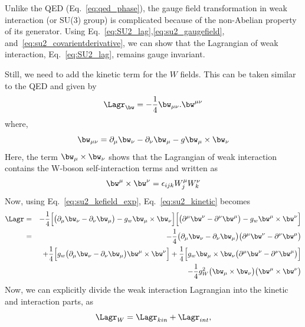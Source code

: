 Unlike the QED (Eq.~\ref{eq:qed_phase}), the gauge field transformation in weak interaction (or SU(3) group) is complicated because of the non-Abelian property of its generator. Using Eq.~\ref{eq:SU2_lag},\ref{eq:su2_gaugefield}, and~\ref{eq:su2_covarientderivative}, we can show that the Lagrangian of weak interaction, Eq.~\ref{eq:SU2_lag}, remains gauge invariant.

Still, we need to add the kinetic term for the $W$ fields. This can be taken similar to the QED and given by
\begin{equation}\label{eq:su2_kinetic}
    \Lagr_{\bw} = -\frac{1}{4}\bw_{\mu \nu}. \bw^{\mu \nu}
\end{equation}
where,
\begin{equation}\label{eq:su2_kefield_exp}
    \bw_{\mu \nu} = \partial_{\mu} \bw_{\nu} - \partial_{\nu} \bw_{\mu} - g \bw_{\mu} \times \bw_{\nu}
\end{equation}
Here, the term $\bw_{\mu} \times \bw_{\nu}$ shows that the Lagrangian of weak interaction contains the W-boson self-interaction terms and written as
\begin{equation}
    \bw^{\mu} \times \bw^{\nu} = \epsilon_{ijk} W^{\mu}_j W^{\nu}_k
\end{equation}
Now, using Eq.~\ref{eq:su2_kefield_exp}, Eq.~\ref{eq:su2_kinetic} becomes
\begin{eqnarray}
    \Lagr & = & -\frac{1}{4} \Big[ \big( \partial_{\mu} \bw_{\nu} - \partial_{\nu} \bw_{\mu} \big) - g_w \bw_{\mu} \times \bw_{\nu} \Big]  \Big[ \big( \partial^{\mu} \bw^{\nu} - \partial^{\nu} \bw^{\mu} \big) - g_w \bw^{\mu} \times \bw^{\nu} \Big] \nonumber \\
        & = & -\frac{1}{4} \big( \partial_{\mu} \bw_{\nu} - \partial_{\nu} \bw_{\mu} \big) \big( \partial^{\mu} \bw^{\nu} - \partial^{\nu} \bw^{\mu} \big) \nonumber \\
        &   & + \frac{1}{4} \Big[  g_w\big( \partial_{\mu} \bw_{\nu} - \partial_{\nu} \bw_{\mu} \big)\bw^{\mu} \times \bw^{\nu} \Big] + \frac{1}{4} \Big[  g_w \bw_{\mu} \times \bw_{\nu}  \big( \partial^{\mu} \bw^{\nu} - \partial^{\nu} \bw^{\mu} \big)\Big] \nonumber \\
        &   & - \frac{1}{4} g_W^2 \big(\bw_{\mu} \times \bw_{\nu}\big) \big(\bw^{\mu} \times \bw^{\nu}\big) 
\end{eqnarray}
Now, we can explicitly divide the weak interaction Lagrangian into the kinetic and interaction parts, as
\begin{equation}
    \Lagr_W = \Lagr_{kin} + \Lagr_{int},
\end{equation}
